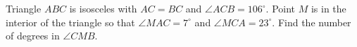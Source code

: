 Triangle $ABC$ is isosceles with $AC = BC$ and $\angle ACB = 106^\circ$.  Point $M$ is in the interior of the triangle so that $\angle MAC = 7^\circ$ and $\angle MCA = 23^\circ$.  Find the number of degrees in $\angle CMB$.